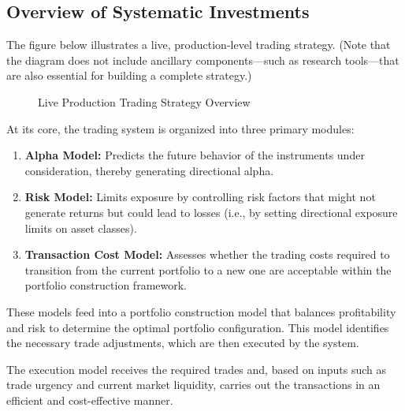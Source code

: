 \subsection{Overview of Systematic Investments}

The figure below illustrates a live, production-level trading strategy. (Note that the diagram does not include ancillary components—such as research tools—that are also essential for building a complete strategy.)

\begin{figure}[H]
\centering

\caption{Live Production Trading Strategy Overview}
\end{figure}

At its core, the trading system is organized into three primary modules:

\begin{enumerate}[label=\roman*.]
\setlength{\itemsep}{0pt}
\item \textbf{Alpha Model:} Predicts the future behavior of the instruments under consideration, thereby generating directional alpha.
\item \textbf{Risk Model:} Limits exposure by controlling risk factors that might not generate returns but could lead to losses (i.e., by setting directional exposure limits on asset classes).
\item \textbf{Transaction Cost Model:} Assesses whether the trading costs required to transition from the current portfolio to a new one are acceptable within the portfolio construction framework.
\end{enumerate}

These models feed into a portfolio construction model that balances profitability and risk to determine the optimal portfolio configuration. This model identifies the necessary trade adjustments, which are then executed by the system.

The execution model receives the required trades and, based on inputs such as trade urgency and current market liquidity, carries out the transactions in an efficient and cost-effective manner.

